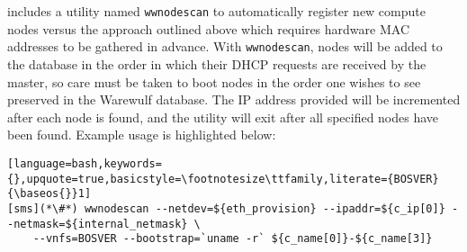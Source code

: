 \begin{center}
\begin{tcolorbox}[]
\small \Warewulf{} includes a utility named \texttt{wwnodescan} 
to automatically register new compute nodes versus the approach outlined
above which requires hardware MAC addresses to be gathered in advance.  With
\texttt{wwnodescan}, nodes will be added to the \Warewulf{} database in the
order in which their DHCP requests are received by the master, so care must be
taken to boot nodes in the order one wishes to see preserved in the Warewulf
database. The IP address provided will be incremented after each node is found,
and the utility will exit after all specified nodes have been found. Example
usage is highlighted below:
\begin{lstlisting}[language=bash,keywords={},upquote=true,basicstyle=\footnotesize\ttfamily,literate={BOSVER}{\baseos{}}1]
[sms](*\#*) wwnodescan --netdev=${eth_provision} --ipaddr=${c_ip[0]} --netmask=${internal_netmask} \
    --vnfs=BOSVER --bootstrap=`uname -r` ${c_name[0]}-${c_name[3]}
\end{lstlisting}
\end{tcolorbox}
\end{center}
